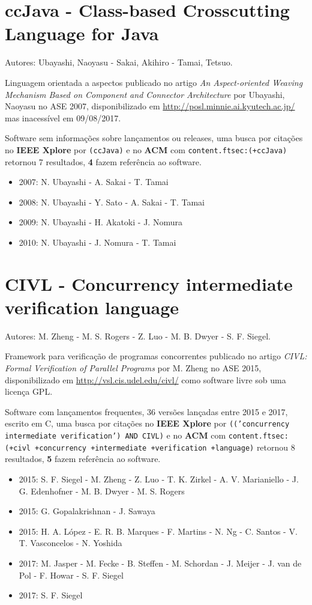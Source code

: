 \section{ccJava - Class-based Crosscutting Language for Java}

Autores:
Ubayashi, Naoyasu - Sakai, Akihiro - Tamai, Tetsuo.

Linguagem orientada a aspectos
publicado no artigo {\it An Aspect-oriented Weaving Mechanism Based on Component and Connector Architecture}
por Ubayashi, Naoyasu
no ASE 2007,
disponibilizado em \url{http://posl.minnie.ai.kyutech.ac.jp/}
mas inacessível em 09/08/2017.

Software sem informações sobre lançamentos ou releases,
uma busca por citações no {\bf IEEE Xplore} por
\texttt{(ccJava)}
e no {\bf ACM} com
\texttt{content.ftsec:(+ccJava)}
retornou
7 resultados,
{\bf 4} fazem referência ao software.

\begin{itemize}
\item 2007: N. Ubayashi - A. Sakai - T. Tamai
\item 2008: N. Ubayashi - Y. Sato - A. Sakai - T. Tamai
\item 2009: N. Ubayashi - H. Akatoki - J. Nomura
\item 2010: N. Ubayashi - J. Nomura - T. Tamai
\end{itemize}

\section{CIVL - Concurrency intermediate verification language}

Autores:
M. Zheng - M. S. Rogers - Z. Luo - M. B. Dwyer - S. F. Siegel.

Framework para verificação de programas concorrentes
publicado no artigo {\it CIVL: Formal Verification of Parallel Programs}
por M. Zheng
no ASE 2015,
disponibilizado em \url{http://vsl.cis.udel.edu/civl/}
como software livre
sob uma licença GPL.

Software com lançamentos frequentes,
36 versões lançadas
entre 2015 e 2017,
escrito em C,
uma busca por citações no {\bf IEEE Xplore} por
\texttt{(('concurrency intermediate verification') AND CIVL)}
e no {\bf ACM} com
\texttt{content.ftsec:(+civl +concurrency +intermediate +verification +language)}
retornou
8 resultados,
{\bf 5} fazem referência ao software.

\begin{itemize}
\item 2015: S. F. Siegel - M. Zheng - Z. Luo - T. K. Zirkel - A. V. Marianiello - J. G. Edenhofner - M. B. Dwyer - M. S. Rogers
\item 2015: G. Gopalakrishnan - J. Sawaya
\item 2015: H. A. L\'{o}pez - E. R. B. Marques - F. Martins - N. Ng - C. Santos - V. T. Vasconcelos - N. Yoshida
\item 2017: M. Jasper - M. Fecke - B. Steffen - M. Schordan - J. Meijer - J. van de Pol - F. Howar - S. F. Siegel
\item 2017: S. F. Siegel
\end{itemize}

